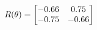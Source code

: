 \documentclass[preview]{standalone}
\begin{document}
\begin{align*}
\special{dvisvgm:raw <g id='unique000'>}R(\theta) = \begin{bmatrix}-0.66 & 0.75\\-0.75 & -0.66\end{bmatrix}\special{dvisvgm:raw </g>}
\end{align*}
\end{document}
